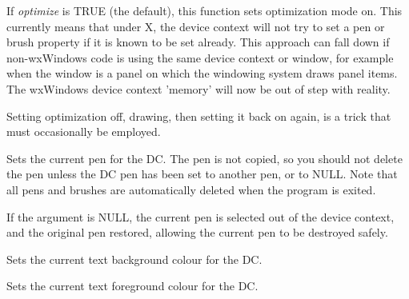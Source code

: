 \begin{twocollist}\itemsep=0pt
\end{twocollist}

\label{wxsetoptimization}


If {\it optimize} is TRUE (the default), this function sets optimization mode on.
This currently means that under X, the device context will not try to set a pen or brush
property if it is known to be set already. This approach can fall down
if non-wxWindows code is using the same device context or window, for example
when the window is a panel on which the windowing system draws panel items.
The wxWindows device context 'memory' will now be out of step with reality.

Setting optimization off, drawing, then setting it back on again, is a trick
that must occasionally be employed.

\label{wxdcsetpen}


Sets the current pen for the DC.  The pen is not copied, so you should
not delete the pen unless the DC pen has been set to another pen, or
to NULL. Note that all pens and brushes are automatically deleted when
the program is exited.

If the argument is NULL, the current pen is selected out of the device
context, and the original pen restored, allowing the current pen to
be destroyed safely.

\label{wxdcsettextbackground}


Sets the current text background colour for the DC.

\label{wxdcsettextforeground}


Sets the current text foreground colour for the DC.

